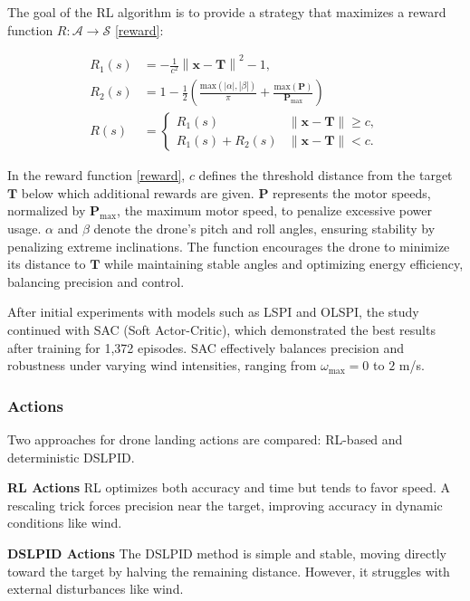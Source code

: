 \documentclass[10pt,journal,compsoc]{IEEEtran}
\begin{document}
The goal of the RL algorithm is to provide a strategy that maximizes a reward function $R : \mathcal{A} \to \mathcal{S}$ \eqref{reward}:

\begin{equation}\label{reward}
\begin{aligned}
    R_1(s)&=-\frac{1}{c^2} \left\|\mathbf{x-T}\right\|^2 -1, 
    \\ 
    R_2(s)&=1-\frac{1}{2}\left(\frac{\text{max}(|\alpha|, |\beta|)}{\pi}+\frac{\text{max}(\mathbf{P})}{\mathbf{P}_\text{max}}\right)
    \\ 
    R(s) &=
\begin{cases}
    R_1(s) & \| \mathbf{x} - \mathbf{T} \| \geq c, \\
    R_1(s) + R_2(s) & \| \mathbf{x} - \mathbf{T} \| < c.
\end{cases}
\end{aligned}
\end{equation}

In the reward function \eqref{reward}, $c$ defines the threshold distance from the target $\mathbf{T}$ below which additional rewards are given. $\mathbf{P}$ represents the motor speeds, normalized by $\mathbf{P}_\text{max}$, the maximum motor speed, to penalize excessive power usage. $\alpha$ and $\beta$ denote the drone's pitch and roll angles, ensuring stability by penalizing extreme inclinations. The function encourages the drone to minimize its distance to $\mathbf{T}$ while maintaining stable angles and optimizing energy efficiency, balancing precision and control.


After initial experiments with models such as LSPI and OLSPI, the study continued with SAC (Soft Actor-Critic), which demonstrated the best results after training for 1,372 episodes. SAC effectively balances precision and robustness under varying wind intensities, ranging from $\omega_{\text{max}} = 0$ to $2$ m/s. \cite{studied}

\subsubsection{Actions}

Two approaches for drone landing actions are compared: RL-based and deterministic DSLPID. \medskip

\textbf{RL Actions} RL optimizes both accuracy and time but tends to favor speed. A rescaling trick forces precision near the target, improving accuracy in dynamic conditions like wind.

\textbf{DSLPID Actions} The DSLPID method is simple and stable, moving directly toward the target by halving the remaining distance. However, it struggles with external disturbances like wind.
\end{document}
